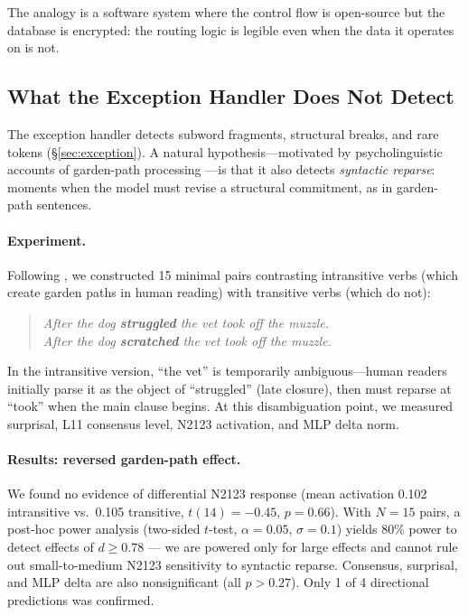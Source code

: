 \documentclass{article}
\begin{document}
The analogy is a software system where the control flow is open-source
but the database is encrypted:
the routing logic is legible even when the data it operates on is not.

\subsection{What the Exception Handler Does Not Detect}
\label{sec:garden_path}

The exception handler detects subword fragments, structural breaks, and rare
tokens (\S\ref{sec:exception}).
A natural hypothesis---motivated by psycholinguistic accounts of garden-path
processing \citep{frazier1982making}---is that it also detects
\emph{syntactic reparse}: moments when the model must revise a
structural commitment, as in garden-path sentences.

\paragraph{Experiment.}
Following \citet{vangompel2001lexical}, we constructed 15 minimal pairs
contrasting intransitive verbs (which create garden paths in human reading)
with transitive verbs (which do not):

\begin{quote}
\emph{After the dog \textbf{struggled} the vet took off the muzzle.} \\
\emph{After the dog \textbf{scratched} the vet took off the muzzle.}
\end{quote}

\noindent In the intransitive version, ``the vet'' is temporarily ambiguous---human
readers initially parse it as the object of ``struggled'' (late closure), then
must reparse at ``took'' when the main clause begins.
At this disambiguation point, we measured surprisal, L11 consensus level, N2123
activation, and MLP delta norm.

\paragraph{Results: reversed garden-path effect.}
We found no evidence of differential N2123 response (mean activation 0.102 intransitive vs.\ 0.105 transitive,
$t(14) = -0.45$, $p = 0.66$).
With $N = 15$ pairs, a post-hoc power analysis (two-sided $t$-test, $\alpha = 0.05$, $\sigma = 0.1$) yields 80\% power to detect effects of $d \geq 0.78$ --- we are powered only for large effects and cannot rule out small-to-medium N2123 sensitivity to syntactic reparse.
Consensus, surprisal, and MLP delta are also nonsignificant (all $p > 0.27$).
Only 1 of 4 directional predictions was confirmed.
\end{document}
